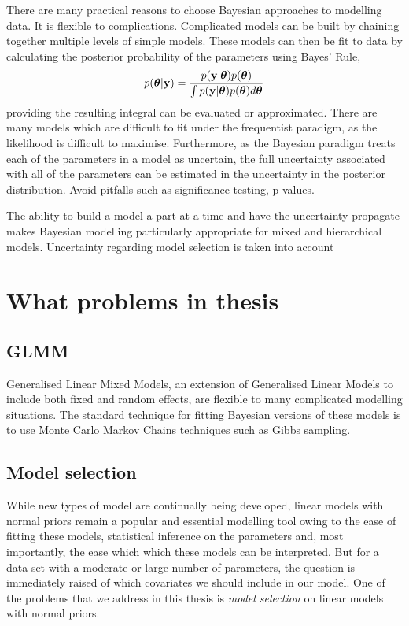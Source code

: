 \documentclass{amsart}[12pt]
\begin{document}
There are many practical reasons to choose Bayesian approaches to modelling data.
It is flexible to complications. Complicated models can be built by chaining together multiple levels of
simple models. These models can then be fit to data by calculating the posterior probability of the
parameters using Bayes' Rule,
\[
	p({\boldsymbol \theta} | {\bf y}) = \frac{p({\bf y} | {\boldsymbol \theta}) p({\boldsymbol \theta})}{\int p({\bf y} | {\boldsymbol \theta}) p({\boldsymbol \theta}) d {\boldsymbol \theta}}
\]
providing the resulting integral can be evaluated or approximated. There are many models which are difficult to
fit under the frequentist paradigm, as the likelihood is difficult to maximise.
Furthermore, as the Bayesian paradigm treats each of the parameters in a model as uncertain, the full
uncertainty associated with all of the parameters can be estimated in the uncertainty in the posterior distribution.
Avoid pitfalls such as significance testing, p-values.
\citep{Janes2014}

The ability to build a model a part at a time and have the uncertainty propagate makes Bayesian modelling 
particularly appropriate for mixed and hierarchical models.
Uncertainty regarding model selection is taken into account

\section{What problems in thesis}
\subsection{GLMM}
Generalised Linear Mixed Models, an extension of Generalised Linear Models to include both fixed and
random effects, are flexible to many complicated modelling situations. The standard technique for fitting
Bayesian versions of these models is to use Monte Carlo Markov Chains techniques such as Gibbs sampling.

\subsection{Model selection}
While new types of model are continually being developed, linear models with normal priors remain a popular
and essential modelling tool owing to the ease of fitting these models, statistical inference on the
parameters and, most importantly, the ease which which these models can be interpreted. But for a data set
with a moderate or large number of parameters, the question is immediately raised of which covariates we should
include in our model. One of the problems that we address in this thesis is \emph{model selection} on linear
models with normal priors.
\end{document}
